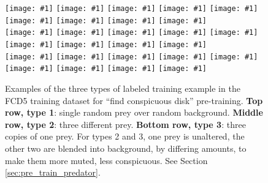 \documentclass[acmtog]{acmart}
\newcommand{\ignine}[1]{\texttt{[image: \#1]}}
\begin{document}
\begin{figure}
    \ignine{20220303_UVSfqCzewt_38_20.png}
    \hfill
    \ignine{20220303_SBWaLRHOzk_56_33.png}
    \hfill
    \ignine{20220303_bUMqcbutgJ_25_78.png}
    \hfill
    \ignine{20220303_HZzUzWWqcC_54_28.png}
    \hfill
    \ignine{20220303_inuPKUxnHQ_72_71.png}
    \hfill
    \ignine{20220303_RRGCwhmcJc_101_84.png}
    \hfill
    \ignine{20220303_PYinyJAWaj_61_60.png}
    \hfill
    \ignine{20220303_TNXfhQtzYa_92_91.png}
    \hfill
    \ignine{20220303_cDMtFaTYKk_63_54.png}
    \\
    \vspace{0.1cm}
    \ignine{20220303_wIRPERwSCh_49_63.png}
    \hfill
    \ignine{20220303_edDsCjbHdf_61_92.png}
    \hfill
    \ignine{20220303_fGMFBgMQDX_93_86.png}
    \hfill
    \ignine{20220303_jQREPLQyuL_33_39.png}
    \hfill
    \ignine{20220303_ijBOHTccYX_104_101.png}
    \hfill
    \ignine{20220303_KAoOFAqFyU_80_58.png}
    \hfill
    \ignine{20220303_NExMwxEbzU_85_92.png}
    \hfill
    \ignine{20220303_kpcUyhHXOh_91_98.png}
    \hfill
    \ignine{20220303_oWPwPGkcSb_82_22.png}
    \\
    \vspace{0.1cm}
    \ignine{20220303_uAEPxMZbeo_83_45.png}
    \hfill
    \ignine{20220303_cADfBauZUV_47_32.png}
    \hfill
    \ignine{20220303_YAMfudJxeH_30_84.png}
    \hfill
    \ignine{20220303_JeyBgDfMcN_40_82.png}
    \hfill
    \ignine{20220303_OaOJaByhbU_90_55.png}
    \hfill
    \ignine{20220303_mhYpDjxaKf_78_57.png}
    \hfill
    \ignine{20220303_ASsEgFUlly_23_60.png}
    \hfill
    \ignine{20220303_nzgItDrYqT_71_99.png}
    \hfill
    \ignine{20220303_QuHYtnPora_72_73.png}
    \caption{Examples of the three types of labeled training example in the FCD5 training dataset for “find conspicuous disk” pre-training. \textbf{Top row, type 1}: single random prey over random background. \textbf{Middle row, type 2}: three different prey. \textbf{Bottom row, type 3}: three copies of one prey. For types 2 and 3, one prey is unaltered, the other two are blended into background, by differing amounts, to make them more muted, less conspicuous. See Section \ref{sec:pre_train_predator}.}
    \label{fig:fcd5_examples}
\end{figure}


\onecolumn
\appendix
\end{document}
